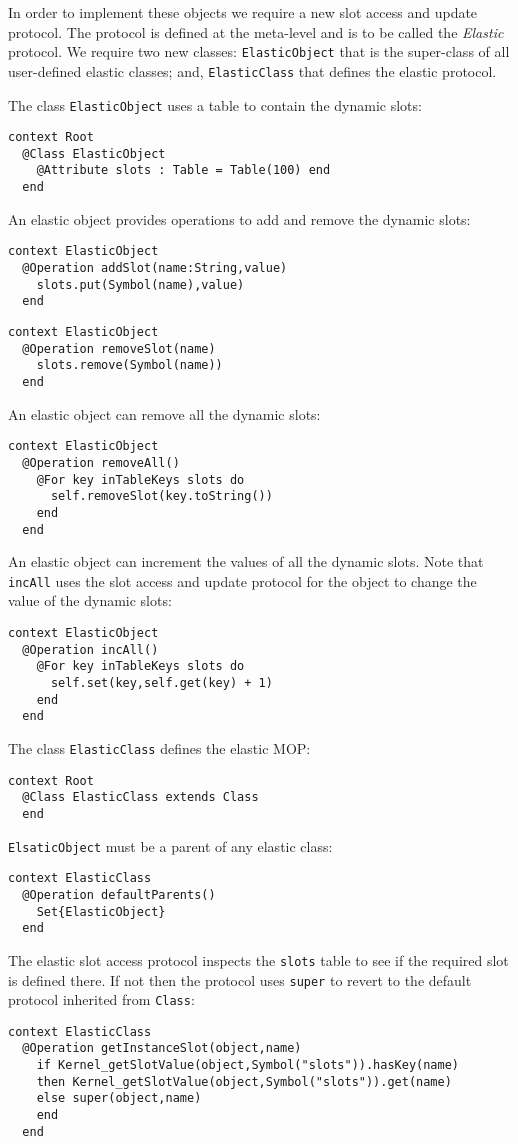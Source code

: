 \documentclass{article}
\begin{document}
In order to implement these objects we require a new slot access and update protocol. The
protocol is defined at the meta-level and is to be called the {\em Elastic} protocol. We require 
two new classes: {\tt ElasticObject} that is the super-class of all user-defined elastic
classes; and, {\tt ElasticClass} that defines the elastic protocol.

The class {\tt ElasticObject} uses a table to contain the dynamic slots:
\begin{verbatim}
context Root
  @Class ElasticObject
    @Attribute slots : Table = Table(100) end
  end
\end{verbatim}
An elastic object provides operations to add and remove the dynamic slots:
\begin{verbatim}
context ElasticObject
  @Operation addSlot(name:String,value)
    slots.put(Symbol(name),value)
  end
\end{verbatim}
\begin{verbatim}
context ElasticObject
  @Operation removeSlot(name)
    slots.remove(Symbol(name))
  end
\end{verbatim}
An elastic object can remove all the dynamic slots:
\begin{verbatim}
context ElasticObject
  @Operation removeAll()
    @For key inTableKeys slots do
      self.removeSlot(key.toString())
    end
  end
\end{verbatim}
An elastic object can increment the values of all the dynamic slots. Note that {\tt incAll}
uses the slot access and update protocol for the object to change the value of the dynamic
slots:
\begin{verbatim}
context ElasticObject
  @Operation incAll()
    @For key inTableKeys slots do
      self.set(key,self.get(key) + 1)
    end
  end
\end{verbatim}
The class {\tt ElasticClass} defines the elastic MOP:
\begin{verbatim}
context Root
  @Class ElasticClass extends Class
  end
\end{verbatim}
{\tt ElsaticObject} must be a parent of any elastic class:
\begin{verbatim}
context ElasticClass
  @Operation defaultParents()
    Set{ElasticObject}
  end
\end{verbatim}
The elastic slot access protocol inspects the {\tt slots} table to see if
the required slot is defined there. If not then the protocol uses {\tt super}
to revert to the default protocol inherited from {\tt Class}:
\begin{verbatim}
context ElasticClass
  @Operation getInstanceSlot(object,name)
    if Kernel_getSlotValue(object,Symbol("slots")).hasKey(name)
    then Kernel_getSlotValue(object,Symbol("slots")).get(name)
    else super(object,name)
    end
  end
\end{verbatim}
\end{document}
